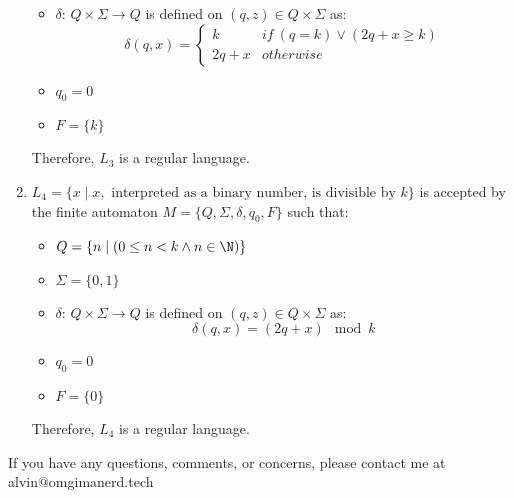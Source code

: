 \documentclass[letterpaper, 12pt]{math}
\begin{document}
\begin{enumerate}
\begin{itemize}
    \item \( \delta \): \( Q\times\Sigma\to Q \) is defined on \( (q,z)\in
    Q\times\Sigma \) as:
    \[ \delta(q,x) = \begin{cases}
      k & if\ (q = k) \vee (2q+x \ge k) \\
      2q+x & otherwise
    \end{cases} \]
    \item \( q_0 = 0 \)
    \item \( F = \{k\} \)
  \end{itemize}
  Therefore, \( L_3 \) is a regular language.
  \item \( L_4 = \{x\mid x,\text{ interpreted as a binary number, is divisible
  by } k\} \) is accepted by the finite automaton \( M =
  \{Q,\Sigma,\delta,q_0,F\} \) such that:
  \begin{itemize}
    \item \( Q = \{n\mid(0\le n<k \wedge n\in\N)\} \)
    \item \( \Sigma = \{0,1\} \)
    \item \( \delta \): \( Q\times\Sigma\to Q \) is defined on \( (q,z)\in
    Q\times\Sigma \) as:
    \[ \delta(q,x) = (2q+x)\mod k \]
    \item \( q_0 = 0 \)
    \item \( F = \{0\} \)
  \end{itemize}
  Therefore, \( L_4 \) is a regular language.
\end{enumerate}

\begin{center}
  If you have any questions, comments, or concerns, please contact me at
  alvin@omgimanerd.tech
\end{center}
\end{document}

